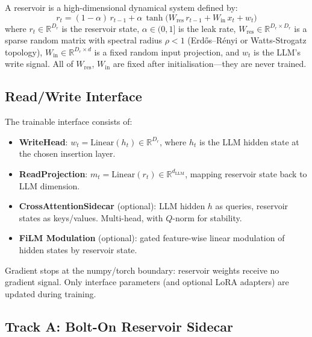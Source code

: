 \documentclass[11pt,a4paper]{article}
\theoremstyle{definition}
\begin{document}
A reservoir is a high-dimensional dynamical system defined by:
\begin{equation}
  r_t = (1 - \alpha)\, r_{t-1}
        + \alpha\, \tanh\!\bigl(W_{\mathrm{res}}\, r_{t-1}
                                + W_{\mathrm{in}}\, x_t
                                + w_t\bigr)
  \label{eq:esn}
\end{equation}
where $r_t \in \mathbb{R}^{D_r}$ is the reservoir state, $\alpha \in (0,1]$
is the leak rate, $W_{\mathrm{res}} \in \mathbb{R}^{D_r \times D_r}$ is a
sparse random matrix with spectral radius $\rho < 1$ (Erdős–Rényi or
Watts-Strogatz topology), $W_{\mathrm{in}} \in \mathbb{R}^{D_r \times d}$ is
a fixed random input projection, and $w_t$ is the LLM's write signal.  All of
$W_{\mathrm{res}}$, $W_{\mathrm{in}}$ are fixed after initialisation---they
are never trained.

\subsection{Read/Write Interface}
\label{sec:interface}

The trainable interface consists of:
\begin{itemize}
  \item \textbf{WriteHead}: $w_t = \mathrm{Linear}(h_t) \in \mathbb{R}^{D_r}$,
    where $h_t$ is the LLM hidden state at the chosen insertion layer.
  \item \textbf{ReadProjection}: $m_t = \mathrm{Linear}(r_t) \in
    \mathbb{R}^{d_{\mathrm{LLM}}}$, mapping reservoir state back to LLM
    dimension.
  \item \textbf{CrossAttentionSidecar} (optional): LLM hidden $h$ as queries,
    reservoir states as keys/values.  Multi-head, with $Q$-norm for stability.
  \item \textbf{FiLM Modulation} (optional): gated feature-wise linear
    modulation of hidden states by reservoir state.
\end{itemize}

Gradient stops at the numpy/torch boundary: reservoir weights receive no
gradient signal.  Only interface parameters (and optional LoRA adapters) are
updated during training.

\subsection{Track A: Bolt-On Reservoir Sidecar}
\label{sec:track_a}
\end{document}
